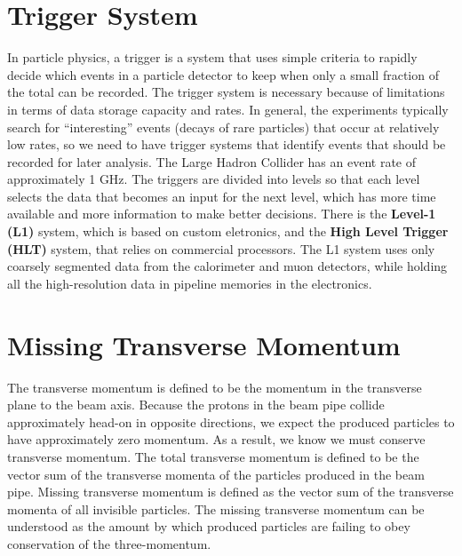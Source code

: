 \section{Trigger System}
In particle physics, a trigger is a system that uses simple criteria to rapidly decide which events in a particle detector to keep when only a small fraction of the total can be recorded.
The trigger system is necessary because of limitations in terms of data storage capacity and rates. 
In general, the experiments typically search for ``interesting'' events (decays of rare particles) that occur at relatively low rates, so we need to have trigger systems that identify events that should be recorded for later analysis. 
The Large Hadron Collider has an event rate of approximately 1 GHz. 
The triggers are divided into levels so that each level selects the data that becomes an input for the next level, which has more time available and more information to make better decisions.
There is the \textbf{Level-1 (L1)} system, which is based on custom eletronics, and the \textbf{High Level Trigger (HLT)} system, that relies on commercial processors. 
The L1 system uses only coarsely segmented data from the calorimeter and muon detectors, while holding all the high-resolution data in pipeline memories in the electronics.
\section{Missing Transverse Momentum}
The transverse momentum is defined to be the momentum in the transverse plane to the beam axis. 
Because the protons in the beam pipe collide approximately head-on in opposite directions, we expect the produced particles to have approximately zero momentum. 
As a result, we know we must conserve transverse momentum. 
The total transverse momentum is defined to be the vector sum of the transverse momenta of the particles produced in the beam pipe. 
Missing transverse momentum is defined as the vector sum of the transverse momenta of all invisible particles.
The missing transverse momentum can be understood as the amount by which produced particles are failing to obey conservation of the three-momentum.
